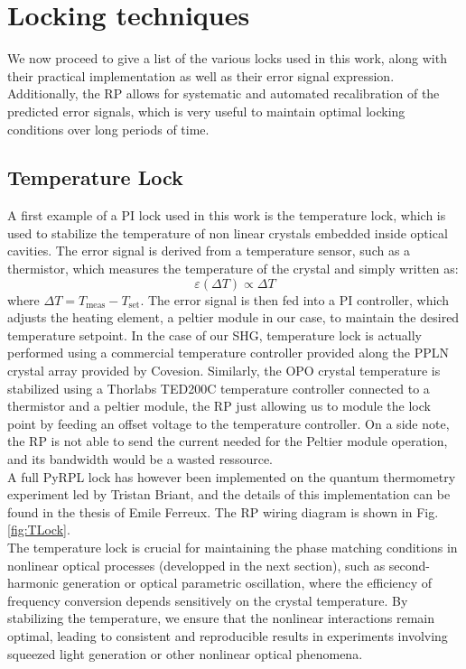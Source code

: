 \section{Locking techniques}
We now proceed to give a list of the various locks used in this work, along with their practical implementation as well as their error signal expression. Additionally, the RP allows for systematic and automated recalibration of the predicted error signals, which is very useful to maintain optimal locking conditions over long periods of time. \\ 
\subsection{Temperature Lock}
A first example of a PI lock used in this work is the temperature lock, which is used to stabilize the temperature of non linear crystals embedded inside optical cavities. The error signal is derived from a temperature sensor, such as a thermistor, which measures the temperature of the crystal and simply written as:
\begin{equation}
\varepsilon(\Delta T) \propto \Delta T 
\end{equation}
where \( \Delta T = T_{\text{meas}} - T_{\text{set}} \).
The error signal is then fed into a PI controller, which adjusts the heating element, a peltier module in our case, to maintain the desired temperature setpoint. In the case of our SHG, temperature lock is actually performed using a commercial temperature controller provided along the PPLN crystal array provided by Covesion. Similarly, the OPO crystal temperature is stabilized using a Thorlabs TED200C temperature controller connected to a thermistor and a peltier module, the RP just allowing us to module the lock point by feeding an offset voltage to the temperature controller. On a side note, the RP is not able to send the current needed for the Peltier module operation, and its bandwidth would be a wasted ressource. \\

A full PyRPL lock has however been implemented on the quantum thermometry experiment led by Tristan Briant, and the details of this implementation can be found in the thesis of Emile Ferreux. The RP wiring diagram is shown in Fig. \ref{fig:TLock}. \\ 

The temperature lock is crucial for maintaining the phase matching conditions in nonlinear optical processes (developped in the next section), such as second-harmonic generation or optical parametric oscillation, where the efficiency of frequency conversion depends sensitively on the crystal temperature. By stabilizing the temperature, we ensure that the nonlinear interactions remain optimal, leading to consistent and reproducible results in experiments involving squeezed light generation or other nonlinear optical phenomena. \\ 


